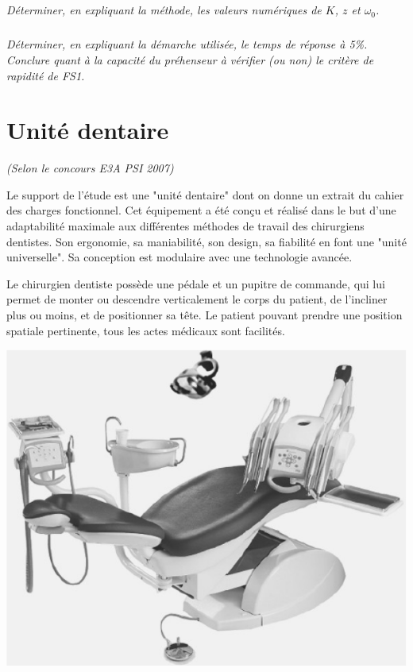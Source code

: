 \documentclass[10pt,fleqn]{article} %
\begin{document}
\begin{multicols}{2}
\subparagraph{}
\textit{Déterminer, en expliquant la méthode, les valeurs numériques de $K$, $z$ et $\omega_0$.}

\subparagraph{}
\textit{Déterminer, en expliquant la démarche utilisée, le temps de réponse à 5\%. Conclure quant à la capacité du préhenseur à vérifier (ou non) le critère de rapidité de FS1.}


\newpage
\setcounter{exo}{0}






\section*{Unité dentaire}
\textit{(Selon le concours E3A PSI 2007)}
\setcounter{exo}{0}


Le support de l'étude est une "unité dentaire" dont on donne un extrait du cahier des charges fonctionnel. Cet équipement a été conçu et réalisé dans le but d'une adaptabilité maximale aux différentes méthodes de travail des chirurgiens dentistes. Son ergonomie, sa maniabilité, son design, sa fiabilité en font une "unité universelle". Sa conception est modulaire avec une technologie avancée.

Le chirurgien dentiste possède une pédale et un pupitre de commande, qui lui permet de monter ou descendre verticalement le corps du patient, de l'incliner plus ou moins, et de positionner sa tête. Le patient pouvant prendre une position spatiale pertinente, tous les actes médicaux sont facilités.

\begin{center}
\includegraphics[width=\linewidth]{images/fig1}
\end{center}



\end{multicols}
\end{document}

